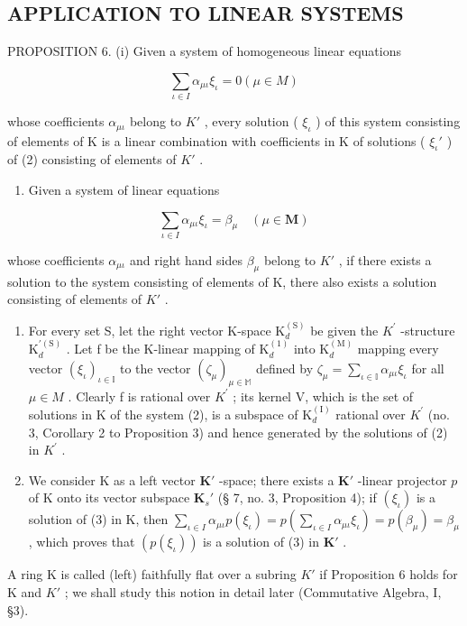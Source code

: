 \subsection{APPLICATION TO LINEAR SYSTEMS}

PROPOSITION 6. (i) Given a system of homogeneous linear equations

\[
\sum_ {\iota \in I} \alpha_ {\mu \iota} \xi_ {\iota} = 0 (\mu \in M)\tag{2}
\]

whose coefficients \(\alpha_{\mu \iota}\) belong to \(K'\) , every solution ( \(\xi_{\iota}\) ) of this system consisting of elements of K is a linear combination with coefficients in K of solutions ( \(\xi_{\iota}'\) ) of (2) consisting of elements of \(K'\) .

\begin{enumerate}
\def\labelenumi{(\roman{enumi})}
\setcounter{enumi}{1}
\tightlist
\item
  Given a system of linear equations
\end{enumerate}

\[
\sum_ {\iota \in I} \alpha_ {\mu \iota} \xi_ {\iota} = \beta_ {\mu} \quad (\mu \in \mathbf {M})\tag{3}
\]

whose coefficients \(\alpha_{\mu \iota}\) and right hand sides \(\beta_{\mu}\) belong to \(K'\) , if there exists a solution to the system consisting of elements of K, there also exists a solution consisting of elements of \(K'\) .

\begin{enumerate}
\def\labelenumi{(\roman{enumi})}
\item
  For every set S, let the right vector K-space \(\mathrm{K}_{d}^{(\mathrm{S})}\) be given the \(K^{\prime}\) -structure \(\mathrm{K}_{d}^{\prime(\mathrm{S})}\) . Let f be the K-linear mapping of \(\mathrm{K}_{d}^{(1)}\) into \(\mathrm{K}_{d}^{(\mathrm{M})}\) mapping every vector \((\xi_{\iota})_{\iota\in\mathbb{I}}\) to the vector \((\zeta_{\mu})_{\mu\in\mathbb{M}}\) defined by \(\zeta_{\mu}=\sum_{\iota\in\mathbb{I}}\alpha_{\mu\iota}\xi_{\iota}\) for all \(\mu\in M\) . Clearly f is rational over \(K^{\prime}\) ; its kernel V, which is the set of solutions in K of the system (2), is a subspace of \(\mathrm{K}_{d}^{(\mathrm{I})}\) rational over \(K^{\prime}\) (no. 3, Corollary 2 to Proposition 3) and hence generated by the solutions of (2) in \(K^{\prime}\) .
\item
  We consider K as a left vector \(\mathbf{K}'\) -space; there exists a \(\mathbf{K}'\) -linear projector \(p\) of K onto its vector subspace \(\mathbf{K}_s'\) (§ 7, no. 3, Proposition 4); if \((\xi_{\iota})\) is a solution of (3) in K, then \(\sum_{\iota \in I} \alpha_{\mu \iota} p(\xi_{\iota}) = p\left(\sum_{\iota \in I} \alpha_{\mu \iota} \xi_{\iota}\right) = p(\beta_\mu) = \beta_\mu\) , which proves that \((p(\xi_{\iota}))\) is a solution of (3) in \(\mathbf{K}'\) .
\end{enumerate}

A ring K is called (left) faithfully flat over a subring \(K'\) if Proposition 6 holds for K and \(K'\) ; we shall study this notion in detail later (Commutative Algebra, I, §3).

